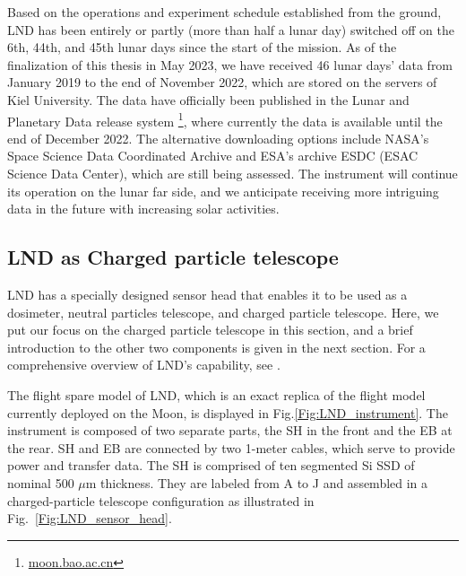 Based on the operations and experiment schedule established from the ground, \ac{LND} has been entirely or partly (more than half a lunar day) switched off on the 6th, 44th, and 45th lunar days since the start of the mission. As of the finalization of this thesis in May 2023, we have received 46 lunar days' data from January 2019 to the end of November 2022, which are stored on the servers of Kiel University. The data have officially been published in the Lunar and Planetary Data release system \footnote{\url{moon.bao.ac.cn}}, where currently the data is available until the end of December 2022. 
The alternative downloading options include \ac{NASA}'s Space Science Data Coordinated Archive and \ac{ESA}'s archive ESDC (ESAC Science Data Center), which are still being assessed. The instrument will continue its operation on the lunar far side, and we anticipate receiving more intriguing data in the future with increasing solar activities.



\subsection*{LND as Charged particle telescope}

\ac{LND} has a specially designed sensor head that enables it to be used as a dosimeter, neutral particles telescope, and charged particle telescope. Here, we put our focus on the charged particle telescope in this section, and a brief introduction to the other two components is given in the next section. For a comprehensive overview of \ac{LND}'s capability, see \citet{Wimmer2020SSRv}.

The flight spare model of \ac{LND}, which is an exact replica of the flight model currently deployed on the Moon, is displayed in Fig.\ref{Fig:LND_instrument}. The instrument is composed of two separate parts, the \acl{SH} in the front and the \acl{EB} at the rear. \ac{SH} and \ac{EB} are connected by two 1-meter cables, which serve to provide power and transfer data. 
The \ac{SH} is comprised of ten segmented Si \acs{SSD} of nominal 500 $\mu$m thickness. They are labeled from A to J and assembled in a charged-particle telescope configuration as illustrated in Fig.~\ref{Fig:LND_sensor_head}.

